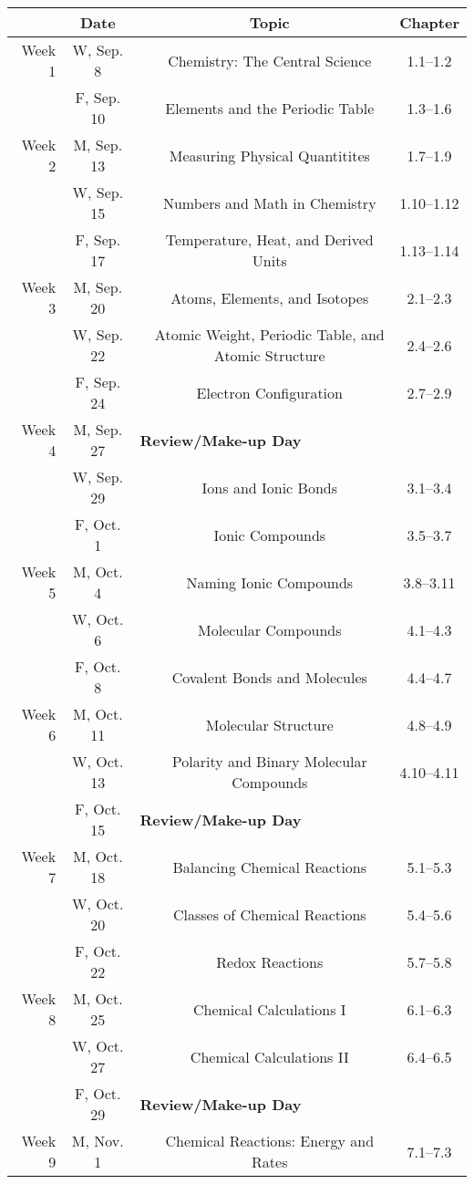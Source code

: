 \begin{tabular}{rcccc}
& Date && Topic & Chapter\\
\midrule
Week 1 & W, Sep. 8&& Chemistry: The Central Science & 1.1--1.2\\
& F, Sep. 10&& Elements and the Periodic Table & 1.3--1.6\\
\midrule
Week 2 & M, Sep. 13&& Measuring Physical Quantitites & 1.7--1.9\\
& W, Sep. 15&& Numbers and Math in Chemistry & 1.10--1.12\\
& F, Sep. 17&& Temperature, Heat, and Derived Units & 1.13--1.14\\
\midrule
Week 3 & M, Sep. 20&& Atoms, Elements, and Isotopes & 2.1--2.3\\
& W, Sep. 22&& Atomic Weight, Periodic Table, and Atomic Structure & 2.4--2.6\\
& F, Sep. 24&& Electron Configuration & 2.7--2.9\\
\midrule
Week 4 & M, Sep. 27& \multicolumn{3}{l}{\textbf{Review/Make-up Day}}\\
& W, Sep. 29&& Ions and Ionic Bonds & 3.1--3.4\\
& F, Oct. 1&& Ionic Compounds & 3.5--3.7\\
\midrule
Week 5 & M, Oct. 4&& Naming Ionic Compounds & 3.8--3.11\\
& W, Oct. 6&& Molecular Compounds & 4.1--4.3\\
& F, Oct. 8&& Covalent Bonds and Molecules & 4.4--4.7\\
\midrule
Week 6 & M, Oct. 11&& Molecular Structure & 4.8--4.9\\
& W, Oct. 13&& Polarity and Binary Molecular Compounds & 4.10--4.11\\
& F, Oct. 15& \multicolumn{3}{l}{\textbf{Review/Make-up Day}}\\
\midrule
Week 7 & M, Oct. 18&& Balancing Chemical Reactions & 5.1--5.3\\
& W, Oct. 20&& Classes of Chemical Reactions & 5.4--5.6\\
& F, Oct. 22&& Redox Reactions & 5.7--5.8\\
\midrule
Week 8 & M, Oct. 25&& Chemical Calculations I & 6.1--6.3\\
& W, Oct. 27&& Chemical Calculations II & 6.4--6.5\\
& F, Oct. 29& \multicolumn{3}{l}{\textbf{Review/Make-up Day}}\\
\midrule
Week 9 & M, Nov. 1&& Chemical Reactions: Energy and Rates & 7.1--7.3\\

\end{tabular}
